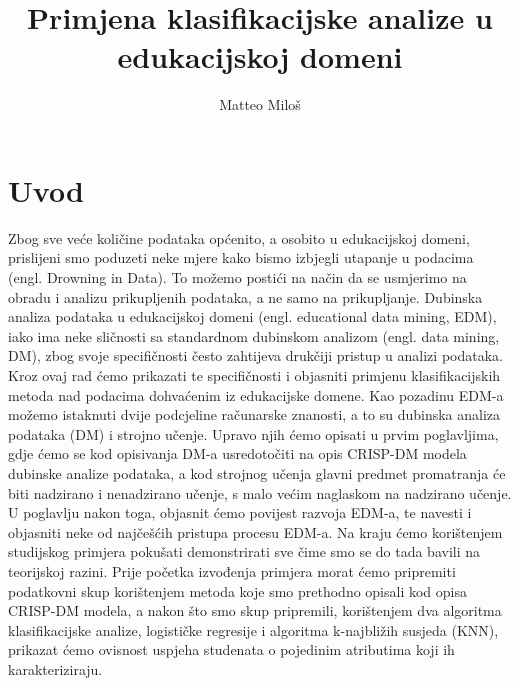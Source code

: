 \documentclass[times, utf8, zavrsni, numeric]{fer}
\begin{document}
\nocite{ungar2002uvod}
\nocite{m1}
\nocite{m2}
\nocite{WIDM:WIDM1075}
\nocite{baker2010data}


\title{Primjena klasifikacijske analize u edukacijskoj domeni}

\author{Matteo Miloš}

\maketitle



\zahvala{}
\hypersetup{
    colorlinks,
    citecolor=black,
    filecolor=black,
    linkcolor=black,
    urlcolor=black
}
\tableofcontents

\chapter*{Uvod}

Zbog sve veće količine podataka općenito, a osobito u edukacijskoj domeni, prislijeni smo poduzeti neke mjere kako bismo izbjegli utapanje u podacima (engl. Drowning in Data). To možemo postići na način da se usmjerimo na obradu i analizu prikupljenih podataka, a ne samo na prikupljanje. Dubinska analiza podataka u edukacijskoj domeni (engl. educational data mining, EDM), iako ima neke sličnosti sa standardnom dubinskom analizom (engl. data mining, DM), zbog svoje specifičnosti često zahtijeva drukčiji pristup u analizi podataka. Kroz ovaj rad ćemo prikazati te specifičnosti i objasniti primjenu klasifikacijskih metoda nad podacima dohvaćenim iz edukacijske domene. Kao pozadinu EDM-a možemo istaknuti dvije podcjeline računarske znanosti, a to su dubinska analiza podataka (DM) i strojno učenje. Upravo njih ćemo opisati u prvim poglavljima, gdje ćemo se kod opisivanja DM-a usredotočiti na opis CRISP-DM modela dubinske analize podataka, a kod strojnog učenja glavni predmet promatranja će biti nadzirano i nenadzirano učenje, s malo većim naglaskom na nadzirano učenje. U poglavlju nakon toga, objasnit ćemo povijest razvoja EDM-a, te navesti i objasniti neke od najčešćih pristupa procesu EDM-a. Na kraju ćemo korištenjem studijskog primjera pokušati demonstrirati sve čime smo se do tada bavili na teorijskoj razini. Prije početka izvođenja primjera morat ćemo pripremiti podatkovni skup korištenjem metoda koje smo prethodno opisali kod opisa CRISP-DM modela, a nakon što smo skup pripremili, korištenjem dva algoritma klasifikacijske analize, logističke regresije i algoritma k-najbližih susjeda (KNN), prikazat ćemo ovisnost uspjeha studenata o pojedinim atributima koji ih karakteriziraju.
\end{document}
